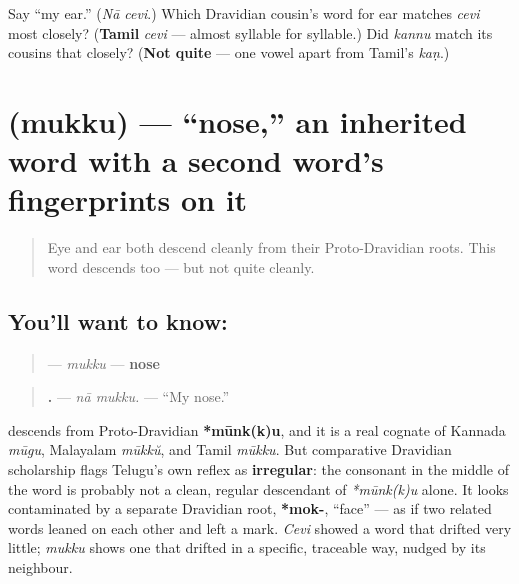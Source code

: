 \begin{tcolorbox}[breakable,colback=teal!4,colframe=teal!35!black,title={Before you move on}]
Say \textquotedblleft{}my ear.\textquotedblright{} (\emph{Nā cevi}.) Which Dravidian cousin's word for ear matches \emph{cevi} most closely? (\textbf{Tamil} \emph{cevi} — almost syllable for syllable.) Did \emph{kannu} match its cousins that closely? (\textbf{Not quite} — one vowel apart from Tamil's \emph{kaṇ}.)
\end{tcolorbox}
\section[\texorpdfstring{\te{ముక్కు} (mukku)}{ముక్కు (mukku)}]{ (mukku) — \textquotedblleft{}nose,\textquotedblright{} an inherited word with a second word's fingerprints on it}

\label{lesson:TE-C37-mukku}



\begin{quote}
Eye and ear both descend cleanly from their Proto-Dravidian roots. This word descends too — but not quite cleanly.
\end{quote}

\subsection*{You'll want to know: }
\begin{quote}
\textbf{} — \emph{mukku} — \textbf{nose}
\end{quote}

\begin{quote}
\textbf{ .} — \emph{nā mukku.} — \textquotedblleft{}My nose.\textquotedblright{}
\end{quote}

\begin{cousinweb}
\textbf{} descends from Proto-Dravidian \textbf{*mūnk(k)u}, and it is a real cognate of Kannada \emph{mūgu}, Malayalam \emph{mūkkŭ}, and Tamil \emph{mūkku}. But comparative Dravidian scholarship flags Telugu's own reflex as \textbf{irregular}: the consonant in the middle of the word is probably not a clean, regular descendant of \emph{*mūnk(k)u} alone. It looks contaminated by a separate Dravidian root, \textbf{*mok-}, \textquotedblleft{}face\textquotedblright{} — as if two related words leaned on each other and left a mark. \emph{Cevi} showed a word that drifted very little; \emph{mukku} shows one that drifted in a specific, traceable way, nudged by its neighbour.
\end{cousinweb}


